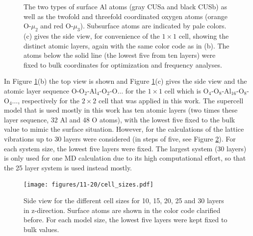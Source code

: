 \documentclass[11pt,DIV=13,BCOR=5mm,a4paper,headinclude]{scrbook}
\begin{document}
\begin{figure}[!h]
{The two types of surface Al atoms (gray CUSa and black CUSb) as well as the twofold and threefold coordinated oxygen atoms (orange O-$\mu_2$ and red O-$\mu_3$).
Subsurface atoms are indicated by pale colors.
(c) gives the side view, for convenience of the $1\times 1$ cell, showing the distinct atomic layers, again with the same color code as in (b).
The atoms below the solid line (the lowest five from ten layers) were fixed to bulk coordinates for optimization and frequency analyses.
}
            \label{abb:crystal_11-20}
\end{figure}
In Figure \ref{abb:crystal_11-20}(b) the top view is shown and Figure \ref{abb:crystal_11-20}(c) gives the side view and the atomic layer sequence O-O$_2$-Al$_4$-O$_2$-O$\ldots$ for the $1\times 1$ cell which is O$_4$-O$_8$-Al$_{16}$-O$_8$-O$_4\ldots$, respectively for the $2\times 2$ cell that was applied in this work.
The supercell model that is used mostly in this work has ten atomic layers (two times these layer sequence, 32 Al and 48 O atoms), with the lowest five fixed to the bulk value to mimic the surface situation.
However, for the calculations of the lattice vibrations up to 30 layers were considered (in steps of five, see Figure \ref{abb:cell_sizes}).
For each system size, the lowest five layers were fixed.
The largest system (30 layers) is only used for one MD calculation due to its high computational effort, so that the 25 layer system is used instead mostly.
\begin{figure}[!h]
    \centering
    \texttt{[image: figures/11-20/cell\_sizes.pdf]}
             \caption{Side view for the different cell sizes for 10, 15, 20, 25 and 30 layers in z-direction.
Surface atoms are shown in the color code clarified before.
For each model size, the lowest five layers were kept fixed to bulk values.}
            \label{abb:cell_sizes}
\end{figure}
\end{document}
